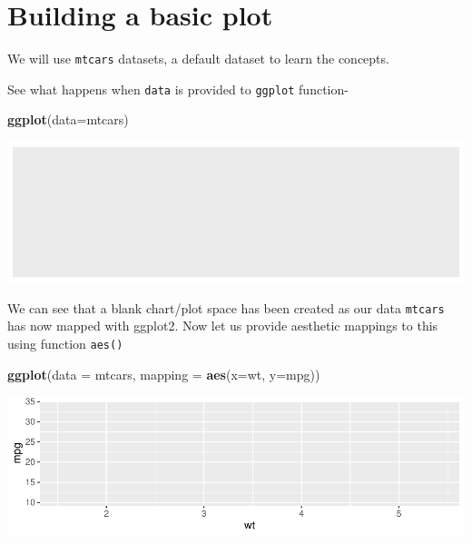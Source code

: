 \documentclass[
]{book}
\newenvironment{Shaded}{\begin{snugshade}}{\end{snugshade}}
\newcommand{\AttributeTok}[1]{\textcolor[rgb]{0.13,0.29,0.53}{#1}}
\newcommand{\FunctionTok}[1]{\textcolor[rgb]{0.13,0.29,0.53}{\textbf{#1}}}
\newcommand{\NormalTok}[1]{#1}
\begin{document}
\hypertarget{building-a-basic-plot}{%
\section{Building a basic plot}\label{building-a-basic-plot}}

We will use \texttt{mtcars} datasets, a default dataset to learn the concepts.

See what happens when \texttt{data} is provided to \texttt{ggplot} function-

\begin{Shaded}
\begin{Highlighting}[]
\FunctionTok{ggplot}\NormalTok{(}\AttributeTok{data=}\NormalTok{mtcars)}
\end{Highlighting}
\end{Shaded}

\begin{center}\includegraphics{DauR_files/figure-latex/fig_blank-1} \end{center}

We can see that a blank chart/plot space has been created as our data \texttt{mtcars} has now mapped with ggplot2. Now let us provide aesthetic mappings to this using function \texttt{aes()}

\begin{Shaded}
\begin{Highlighting}[]
\FunctionTok{ggplot}\NormalTok{(}\AttributeTok{data =}\NormalTok{ mtcars, }\AttributeTok{mapping =} \FunctionTok{aes}\NormalTok{(}\AttributeTok{x=}\NormalTok{wt, }\AttributeTok{y=}\NormalTok{mpg))}
\end{Highlighting}
\end{Shaded}

\begin{center}\includegraphics{DauR_files/figure-latex/fig_gg_2-1} \end{center}
\end{document}
